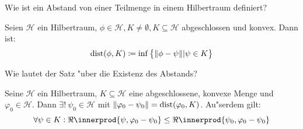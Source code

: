 \documentclass[9pt]{article}
\DeclarePairedDelimiter{\innerprod}\langle\rangle
\newcommand{\Hi}{\mathcal{H}}
\newenvironment{field}{}{\newpage}
\newif\ifnote
\newenvironment{note}{\notetrue}{\notefalse}
\newcommand{\localtag}{}
\newcommand{\globaltag}{}
\newcommand{\uuid}{}
\newcommand{\tags}[1]{
    \ifnote 
        \renewcommand{\localtag}{#1}
    \else
        \renewcommand{\globaltag}{#1}
    \fi 
    }
\newcommand{\xplain}[1]{\renewcommand{\uuid}{#1}}
\begin{document}
	\begin{note}
		\xplain{3046dd82-95de-4b7d-a474-2e2d657331e7}
		\tags{definition, satz, 5.2.9, 5.2.10}
		
		\begin{field}  %
			Wie ist ein Abstand von einer Teilmenge in einem Hilbertraum definiert?
		\end{field}
		
		\begin{field}  %
			Seien $\Hi$ ein Hilbertraum, $\phi \in \Hi, K \neq \emptyset, K \subseteq \Hi$ abgeschlossen und konvex. Dann ist:
			\begin{equation*}
				\text{dist}(\phi, K) \coloneqq \inf\qty{\norm{\phi - \psi} | \psi \in K}
			\end{equation*}
		\end{field}
	
		\begin{field}  %
			Wie lautet der Satz "uber die Existenz des Abstands?
		\end{field}
		
		\begin{field}  %
			Seine $\Hi$ ein Hilbertraum, $K\subseteq \Hi$ eine abgeschlossene, konvexe Menge und $\varphi_0 \in \Hi$. Dann $\exists! \ \psi_0 \in \Hi$ mit $\norm{\varphi_0 - \psi_0} = \text{dist}(\varphi_0, K)$. Au"serdem gilt:
			\begin{equation*}
				\forall \psi \in K: \real\innerprod{\psi, \varphi_0 - \psi_0} \leq \real\innerprod{\psi_0, \varphi_0 - \psi_0}
			\end{equation*} 
		\end{field}
	\end{note}	
\end{document}
